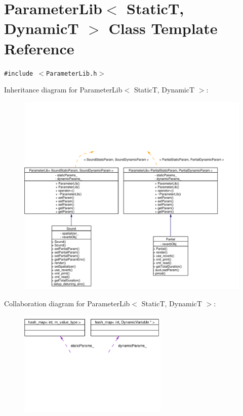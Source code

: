\hypertarget{classParameterLib}{
\section{Parameter\-Lib$<$ Static\-T, Dynamic\-T $>$ Class Template Reference}
\label{classParameterLib}
}
{\tt \#include $<$Parameter\-Lib.h$>$}

Inheritance diagram for Parameter\-Lib$<$ Static\-T, Dynamic\-T $>$:\begin{figure}[H]
\begin{center}
\leavevmode
\includegraphics[width=353pt]{classParameterLib__inherit__graph}
\end{center}
\end{figure}
Collaboration diagram for Parameter\-Lib$<$ Static\-T, Dynamic\-T $>$:\begin{figure}[H]
\begin{center}
\leavevmode
\includegraphics[width=202pt]{classParameterLib__coll__graph}
\end{center}
\end{figure}
